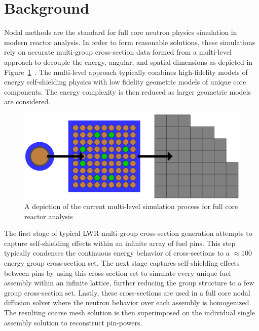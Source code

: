 \section{Background}
\label{sec:chap1-background}

Nodal methods are the standard for full core neutron physics simulation in modern reactor analysis. In order to form reasonable solutions, these simulations rely on accurate multi-group cross-section data formed from a multi-level approach to decouple the energy, angular, and spatial dimensions as depicted in Figure~\ref{fig:multi-level}~\cite{boyd2017thesis}. The multi-level approach typically combines high-fidelity models of energy self-shielding physics with low fidelity geometric models of unique core components. The energy complexity is then reduced as larger geometric models are considered.

\begin{figure}[ht!]
	\centering
	\includegraphics[width=\linewidth]{figures/intro/multi-step-flow-chart.png}
	\caption{A depiction of the current multi-level simulation process for full core reactor analysis}
	\label{fig:multi-level}
\end{figure}

The first stage of typical \ac{LWR} multi-group cross-section generation attempts to capture self-shielding effects within an infinite array of fuel pins. This step typically condenses the continuous energy behavior of cross-sections to a $\approx 100$ energy group cross-section set. The next stage captures self-shielding effects between pins by using this cross-section set to simulate every unique fuel assembly within an infinite lattice, further reducing the group structure to a few group cross-section set. Lastly, these cross-sections are used in a full core nodal diffusion solver where the neutron behavior over each assembly is homogenized. The resulting coarse mesh solution is then superimposed on the individual single assembly solution to reconstruct pin-powers.


